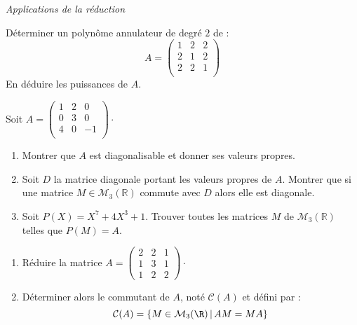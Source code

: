 \documentclass[a4paper,10pt]{report}
\begin{document}
\medskip

\begin{center}
\textit{{ {\large Applications de la réduction}}}
\end{center}

\medskip

\begin{Exercice}{} Déterminer un polynôme annulateur de degré $2$ de :
$$ A = \begin{pmatrix}
1 & 2 & 2 \\
2 & 1 & 2 \\
2 & 2 & 1 \\
\end{pmatrix}$$
En déduire les puissances de $A$. 
\end{Exercice}


\begin{Exercice}{}Soit $A= \begin{pmatrix}
1 & 2 & 0 \\
0 & 3 & 0 \\
4 & 0 & -1 \\
\end{pmatrix}\cdot$
\begin{enumerate}
\item Montrer que $A$ est diagonalisable et donner ses valeurs propres.
\item Soit $D$ la matrice diagonale portant les valeurs propres de $A$. Montrer que si une matrice $M \in \mathcal{M}_3(\mathbb{R})$ commute avec $D$ alors elle est diagonale.
\item Soit $P(X)=X^7+ 4X^3+1$. Trouver toutes les matrices $M$ de $\mathcal{M}_3(\mathbb{R})$ telles que $P(M)=A$.
\end{enumerate}
\end{Exercice}


\begin{Exercice}{}
\begin{enumerate}
\item R\'eduire la matrice $A= \left(\begin{array}{rrr}  2 & 2 & 1\\
1 & 3 & 1\\
1 & 2 & 2 \end{array}\right) \cdot $\\
\item Déterminer alors le commutant de $A$, noté $\mathcal{C}(A)$ et défini par : 
$${\cal C}(A)=\{M\in{\cal M}_3(\R) \, \vert \, AM=MA\}$$
\end{enumerate}
\end{Exercice} 
\end{document}
